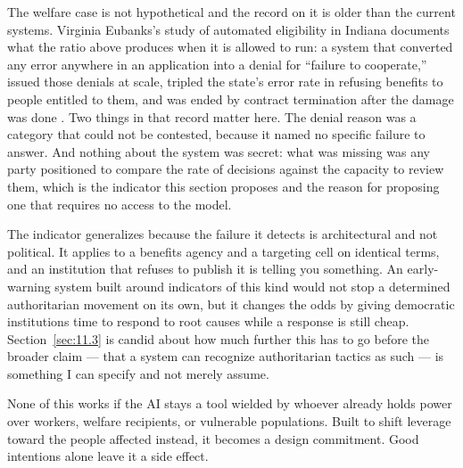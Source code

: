 The welfare case is not hypothetical and the record on it is older than the current systems. Virginia Eubanks's study of automated eligibility in Indiana documents what the ratio above produces when it is allowed to run: a system that converted any error anywhere in an application into a denial for “failure to cooperate,” issued those denials at scale, tripled the state's error rate in refusing benefits to people entitled to them, and was ended by contract termination after the damage was done \autocite{eubanks2018automating}. Two things in that record matter here. The denial reason was a category that could not be contested, because it named no specific failure to answer. And nothing about the system was secret: what was missing was any party positioned to compare the rate of decisions against the capacity to review them, which is the indicator this section proposes and the reason for proposing one that requires no access to the model.

The indicator generalizes because the failure it detects is architectural and not political. It applies to a benefits agency and a targeting cell on identical terms, and an institution that refuses to publish it is telling you something. An early-warning system built around indicators of this kind would not stop a determined authoritarian movement on its own, but it changes the odds by giving democratic institutions time to respond to root causes while a response is still cheap. Section~\ref{sec:11.3} is candid about how much further this has to go before the broader claim — that a system can recognize authoritarian tactics as such — is something I can specify and not merely assume.

None of this works if the AI stays a tool wielded by whoever already holds power over workers, welfare recipients, or vulnerable populations. Built to shift leverage toward the people affected instead, it becomes a design commitment. Good intentions alone leave it a side effect.
